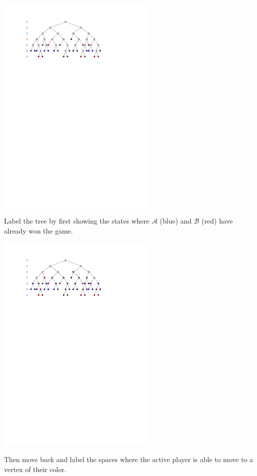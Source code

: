 \documentclass{beamer}
\theoremstyle{theorem}
\theoremstyle{definition}
\newcommand{\<}{\langle}
\renewcommand{\>}{\rangle}
\newcommand{\pl}[1]{\mathscr{#1}}
\begin{document}
\begin{frame}
  \centerline{\includegraphics[width=3in]{decisionTree2.pdf}}

  \vspace{1em}

  Label the tree by first showing the states where $\pl A$ (blue) and
  $\pl B$ (red) have already won the game.
\end{frame}

\begin{frame}
  \centerline{\includegraphics[width=3in]{decisionTree3.pdf}}

  \vspace{1em}

  Then move back and label the spaces where the active player is able
  to move to a vertex of their color.
\end{frame}
\end{document}
